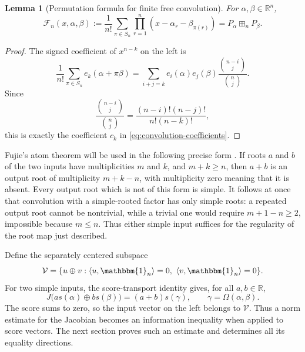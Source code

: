\documentclass[12pt,reqno]{amsart}
\newtheorem{lemma}[lemma]{Lemma}
\theoremstyle{definition}
\theoremstyle{remark}
\newcommand{\R}{\mathbb R}
\newcommand{\one}{\mathbbm{1}_n}
\begin{document}
\begin{lemma}[Permutation formula for finite free convolution]
\label{lem:permutation-formula}
For \(\alpha,\beta\in\R^n\),
\begin{equation}\label{eq:hyperbolic-F}
 \mathcal F_n(x,\alpha,\beta)
 :=\frac1{n!}\sum_{\pi\in S_n}
 \prod_{r=1}^n(x-\alpha_r-\beta_{\pi(r)})
 =P_\alpha\boxplus_nP_\beta.
\end{equation}
\end{lemma}

\begin{proof}
The signed coefficient of \(x^{n-k}\) on the left is
\[
 \frac1{n!}\sum_{\pi\in S_n}e_k(\alpha+\pi\beta)
 =\sum_{i+j=k}e_i(\alpha)e_j(\beta)
   \frac{\binom{n-i}{j}}{\binom nj}.
\]
Since
\[
 \frac{\binom{n-i}{j}}{\binom nj}
 =\frac{(n-i)!(n-j)!}{n!(n-k)!},
\]
this is exactly the coefficient \(c_k\) in
\eqref{eq:convolution-coefficients}.
\end{proof}

Fujie's atom theorem will be used in the following precise form
\cite[Propositions~3.6 and~3.8]{Fujie26}.  If roots \(a\) and \(b\) of
the two inputs have multiplicities \(m\) and \(k\), and
\(m+k\geq n\), then \(a+b\) is an output root of multiplicity
\(m+k-n\), with multiplicity zero meaning that it is absent.  Every output
root which is not of this form is simple.  It follows at once that
convolution with a simple-rooted factor has only simple roots: a repeated
output root cannot be nontrivial, while a trivial one would require
\(m+1-n\geq2\), impossible because \(m\leq n\).  Thus either simple
input suffices for the regularity of the root map just described.

Define the separately centered subspace
\begin{equation}\label{eq:centered-subspace}
 \mathcal V=\{u\oplus v:\langle u,\one\rangle=0,
 \ \langle v,\one\rangle=0\}.
\end{equation}
For two simple inputs, the score-transport identity
\cite[Lemma~3.2]{GVS26} gives, for all \(a,b\in\R\),
\begin{equation}\label{eq:score-transport}
 J\bigl(a s(\alpha)\oplus b s(\beta)\bigr)
 =(a+b)s(\gamma),\qquad \gamma=\Omega(\alpha,\beta).
\end{equation}
The score sums to zero, so the input vector on the left belongs to
\(\mathcal V\).  Thus a norm estimate for the Jacobian becomes an information inequality
when applied to score vectors.  The next section proves such an estimate
and determines all its equality directions.
\end{document}

